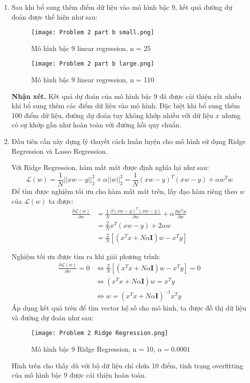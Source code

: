 \documentclass[a4paper, 12pt]{article}  %
\begin{document}
\begin{enumerate}[label=\alph*.]
    \item Sau khi bổ sung thêm điểm dữ liệu vào mô hình bậc 9, kết quả đường dự đoán được thể hiện như sau:
    \begin{figure}[H]
        \centering
        \texttt{[image: Problem 2 part b small.png]}
        \caption{Mô hình bậc 9 linear regression, n = 25}
        \label{fig:Data5}
    \end{figure}
    
    \begin{figure}[H]
        \centering
        \texttt{[image: Problem 2 part b large.png]}
        \caption{Mô hình bậc 9 linear regression, n = 110}
        \label{fig:Data6}
    \end{figure}
    
    \textbf{Nhận xét.} Kết quả dự đoán của mô hình bậc 9 đã được cải thiện rất nhiều khi bổ sung thêm các điểm dữ liệu vào mô hình. Đặc biệt khi bổ sung thêm 100 điểm dữ liệu, đường dự đoán tuy không khớp nhiều với dữ liệu $x$ nhưng có sự khớp gần như hoàn toàn với đường hồi quy chuẩn.
    
    \item Đầu tiên cần xây dựng lý thuyết cách huấn luyện cho mô hình sử dụng Ridge Regression và Lasso Regression.
    
    Với Ridge Regression, hàm mất mát được định nghĩa lại như sau:
    \[\mathcal{L}(w) = \frac{1}{N} ||xw - y||^2_2 + \alpha||w||_2^2 
    = \frac{1}{N} (xw - y)^T (xw - y) + \alpha w^T w\]
    Để tìm được nghiệm tối ưu cho hàm mất mát trên, lấy đạo hàm riêng theo $w$ của $\mathcal{L}(w)$ ta được:
    \begin{align*}
        \frac{\partial \mathcal{L}(w)}{\partial w} &= \frac{1}{N} \frac{\partial (xw - y)^T (xw - y)}{\partial w} + \alpha \frac{\partial w^T w}{\partial w}\\
        &= \frac{2}{N} x^T (xw - y) + 2\alpha w \\
        &= \frac{2}{N} [(x^T x + N \alpha \mathbf{I})w - x^T y]
    \end{align*}
    
    Nghiệm tối ưu được tìm ra khi giải phương trình:
    \begin{align*}
        \frac{\partial \mathcal{L}(w)}{\partial w} = 0 &\Longleftrightarrow \frac{2}{N} [(x^T x + N \alpha \mathbf{I})w - x^T y] = 0\\
        &\Longleftrightarrow (x^T x + N \alpha \mathbf{I})w = x^T y\\
        &\Longleftrightarrow w = (x^T x + N \alpha \mathbf{I})^{-1} x^T y
    \end{align*}
    Áp dụng kết quả trên để tìm vector hệ số cho mô hình, ta được đồ thị dữ liệu và đường dự đoán như sau:
    \begin{figure}[H]
        \centering
        \texttt{[image: Problem 2 Ridge Regression.png]}
        \caption{Mô hình bậc 9 Ridge Regression, n = 10, $\alpha = 0.0001$}
        \label{fig:Data7}
    \end{figure}
    Hình trên cho thấy dù với bộ dữ liệu chỉ chứa 10 điểm, tình trạng overfitting của mô hình bậc 9 được cải thiện hoàn toàn.
    

\end{enumerate}
\end{document}
